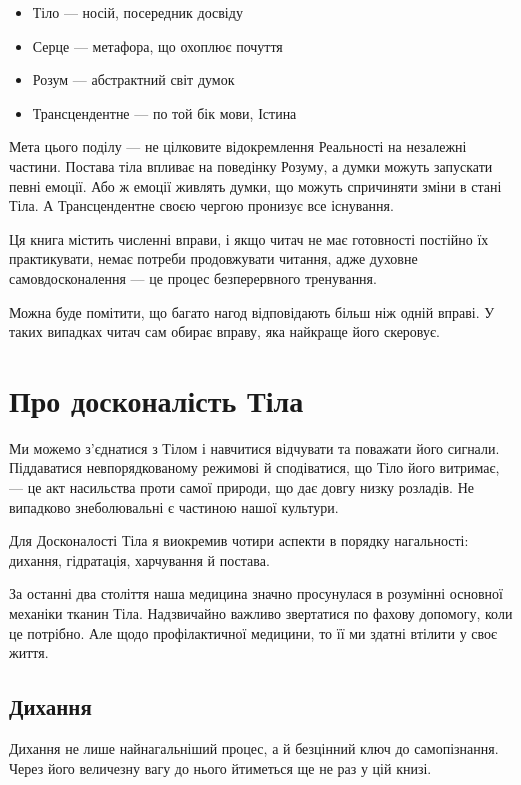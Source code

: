 \documentclass[oneside, 12pt]{book}
\begin{document}
\begin{itemize}
\item Тіло --- носій, посередник досвіду
\item Серце --- метафора, що охоплює почуття
\item Розум --- абстрактний світ думок
\item Трансцендентне --- по той бік мови, Істина
\end{itemize}

Мета цього поділу --- не цілковите відокремлення Реальності на незалежні частини. Постава тіла впливає на поведінку Розуму, а думки можуть запускати певні емоції. Або ж емоції живлять думки, що можуть спричиняти зміни в стані Тіла. А Трансцендентне своєю чергою пронизує все існування.

Ця книга містить численні вправи, і якщо читач не має готовності постійно їх практикувати, немає потреби продовжувати читання, адже духовне самовдосконалення --- це процес безперервного тренування.

Можна буде помітити, що багато нагод відповідають більш ніж одній вправі. У таких випадках читач сам обирає вправу, яка найкраще його скеровує.

\chapter*{Про досконалість Тіла}

Ми можемо з'єднатися з Тілом і навчитися відчувати та поважати його сигнали. Піддаватися невпорядкованому режимові й сподіватися, що Тіло його витримає, --- це акт насильства проти самої природи, що дає довгу низку розладів. Не випадково знеболювальні є частиною нашої культури.

Для Досконалості Тіла я виокремив чотири аспекти в порядку нагальності: дихання, гідратація, харчування й постава.

За останні два століття наша медицина значно просунулася в розумінні основної механіки тканин Тіла. Надзвичайно важливо звертатися по фахову допомогу, коли це потрібно. Але щодо профілактичної медицини, то її ми здатні втілити у своє життя.

\section*{Дихання}

Дихання не лише найнагальніший процес, а й безцінний ключ до самопізнання. Через його величезну вагу до нього йтиметься ще не раз у цій книзі.
\end{document}
